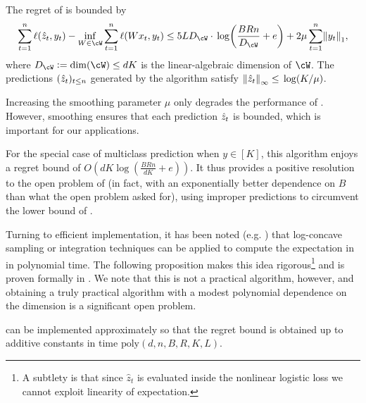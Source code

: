 \begin{theorem}
\label{thm:multiclass_logistic_regret}
The regret of  is bounded by
\begin{equation}
\label{eq:regret_main}
\sum_{t=1}^{n}\ls(\zh_t,y_t) - \inf_{W\in\cW}\sum_{t=1}^{n}\ls(Wx_t,y_t) \leq{} 5LD_{\cW}\cdot{}\log\prn*{\frac{BRn}{D_{\cW}} + e} + 2\mu\sum_{t=1}^{n}\nrm*{y_t}_{1},
\end{equation}
where $D_{\cW}\ldef{}\mathrm{dim}(\cW)\leq{}dK$ is the linear-algebraic dimension of $\cW$.
The predictions $(\zh_t)_{t\leq{}n}$ generated by the algorithm satisfy $\nrm*{\zh_t}_{\infty} \leq{} \log(K/\mu)$.
\end{theorem}
Increasing the smoothing parameter $\mu$ only degrades the performance of . However, smoothing ensures that each prediction $\zh_t$ is bounded, which is important for our applications.

For the special case of multiclass prediction when $y \in [K]$, this algorithm enjoys a regret bound of $O(dK\log(\frac{BRn}{dK}+e))$. It thus provides a positive resolution to the open problem of \citet{mcmahan2012open} (in fact, with an exponentially better dependence on $B$ than what the open problem asked for), using improper predictions to circumvent the lower bound of \citet{hazan2014logistic}.

Turning to efficient implementation, it has been noted (e.g. \citep{hazan2007logarithmic}) that log-concave sampling or integration techniques \citep{lovasz2006fast, lovasz2007geometry} can be applied to compute the expectation in  in polynomial time. The following proposition makes this idea rigorous\footnote{A subtlety is that since $\hat{z}_t$ is evaluated inside the nonlinear logistic loss we cannot exploit linearity of expectation.} and is proven formally in . We note that this is not a practical algorithm, however, and obtaining a truly practical algorithm with a modest polynomial dependence on the dimension is a significant open problem.
\begin{proposition}
\label{prop:alg_polytime}
 can be implemented approximately so that the regret bound  is obtained up to additive constants in time $\mathrm{poly}(d, n, B, R, K, L)$.
\end{proposition}

